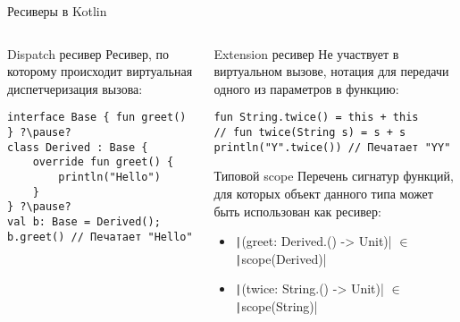 \documentclass[handout,aspectratio=169,usenames,dvipsnames]{beamer}
\begin{document}
\begin{frame}[fragile]{Ресиверы в Kotlin}
    \pause
    \begin{columns}[onlytextwidth]
        \begin{column}{0.375\textwidth}
            \begin{block}{Dispatch ресивер}
                Ресивер, по которому происходит виртуальная диспетчеризация вызова: \pause
                \begin{verbatim}
interface Base { fun greet() } ?\pause?
class Derived : Base {
    override fun greet() {
        println("Hello")
    }
} ?\pause?
val b: Base = Derived();
b.greet() // Печатает "Hello"
                \end{verbatim}
            \end{block}
        \end{column}\hfill%
        \pause
        \begin{column}{0.595\textwidth}
            \begin{block}{Extension ресивер}
                Не участвует в виртуальном вызове, нотация для передачи одного из параметров в функцию: \pause
                 \begin{verbatim}
fun String.twice() = this + this
// fun twice(String s) = s + s
println("Y".twice()) // Печатает "YY"
                 \end{verbatim}
            \end{block}
            \pause
            \begin{block}{Типовой scope}
                Перечень сигнатур функций, для которых объект данного типа может быть использован как ресивер:
                \begin{itemize}
                    \item \texttt|(greet: Derived.() -> Unit)| $\in$ \texttt|scope(Derived)|
                    \item \texttt|(twice: String.() -> Unit)| $\in$ \texttt|scope(String)|
                \end{itemize}
            \end{block}
        \end{column}
    \end{columns}
\end{frame}
\end{document}
